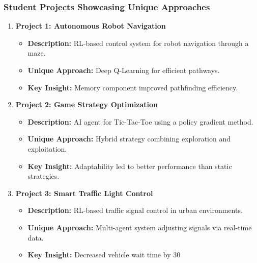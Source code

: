 \documentclass{beamer}
\begin{document}
\begin{frame}[fragile]
    \frametitle{Student Projects Showcasing Unique Approaches}
    \begin{enumerate}
        \item \textbf{Project 1: Autonomous Robot Navigation}
            \begin{itemize}
                \item \textbf{Description:} RL-based control system for robot navigation through a maze.
                \item \textbf{Unique Approach:} Deep Q-Learning for efficient pathways.
                \item \textbf{Key Insight:} Memory component improved pathfinding efficiency.
            \end{itemize}
        
        \item \textbf{Project 2: Game Strategy Optimization}
            \begin{itemize}
                \item \textbf{Description:} AI agent for Tic-Tac-Toe using a policy gradient method.
                \item \textbf{Unique Approach:} Hybrid strategy combining exploration and exploitation.
                \item \textbf{Key Insight:} Adaptability led to better performance than static strategies.
            \end{itemize}
        
        \item \textbf{Project 3: Smart Traffic Light Control}
            \begin{itemize}
                \item \textbf{Description:} RL-based traffic signal control in urban environments.
                \item \textbf{Unique Approach:} Multi-agent system adjusting signals via real-time data.
                \item \textbf{Key Insight:} Decreased vehicle wait time by 30%
            \end{itemize}
    \end{enumerate}
\end{frame}
\end{document}
